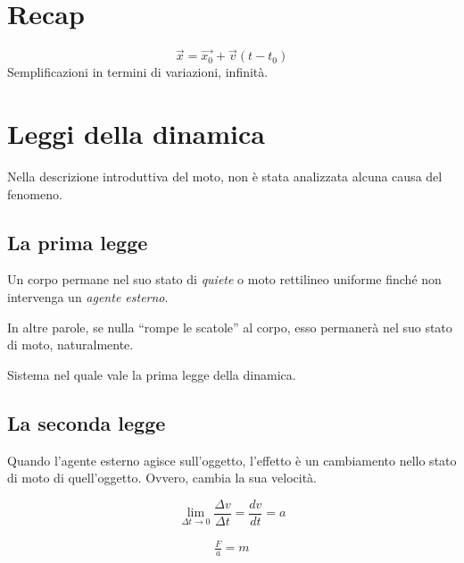 %


\section{Recap}
\[ \overrightarrow{x} = \overrightarrow{x_0} + \overrightarrow{v}(t - t_0) \]
Semplificazioni in termini di variazioni, infinità.

\section{Leggi della dinamica}

Nella descrizione introduttiva del moto, non è stata analizzata alcuna causa del
fenomeno.

\subsection{La prima legge}

\vspace{8pt}
\begin{tcolorbox}[colback = red!30, colframe = red!30!black, title = {Prima legge della dinamica (legge di inerzia)}]
    Un corpo permane nel suo stato di \textit{quiete} o moto rettilineo uniforme
    finché non intervenga un \textit{agente esterno}.
\end{tcolorbox}
\vspace{5pt}

In altre parole, se nulla ``rompe le scatole'' al corpo, esso permanerà nel suo
stato di moto, naturalmente.

\vspace{8pt}
\begin{tcolorbox}[colback = yellow!30, colframe = yellow!30!black, title = {Sistema inerziale}]
    Sistema nel quale vale la prima legge della dinamica.
\end{tcolorbox}
\vspace{5pt}

\subsection{La seconda legge}
Quando l'agente esterno agisce sull'oggetto, l'effetto è un cambiamento nello
stato di moto di quell'oggetto. Ovvero, cambia la sua velocità.

\[ \lim_{\Delta t \to 0} \frac{\Delta v}{\Delta t} = \frac{dv}{dt} = a \]

\vspace{8pt}
\begin{tcolorbox}[colback = red!30, colframe = red!30!black, title = {Seconda legge della dinamica}]
    \begin{align}
        \frac{F}{a} = m
    \end{align}
\end{tcolorbox}
\vspace{5pt}

